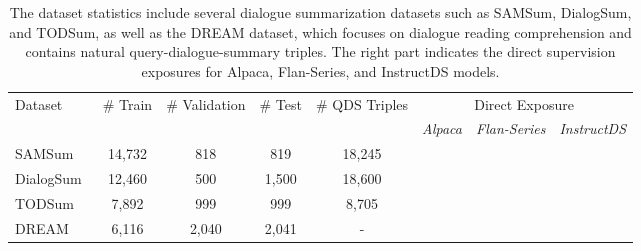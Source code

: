 \documentclass[11pt]{article}
\newcommand{\cmark}{\ding{51}}\newcommand{\xmark}{\ding{55}}\usepackage{subcaption}
\begin{document}
\begin{table*}[t]
        \centering
        \begin{adjustbox}{width=1.00\textwidth,center}
        \begin{tabular}{| l | c | c | c | c | c  c  c |}
        \toprule
        \multirow{2}{*}{Dataset} & \multirow{2}{*}{\# Train} & \multirow{2}{*}{\# Validation} & \multirow{2}{*}{\# Test} & \multirow{2}{*}{\# QDS Triples} & \multicolumn{3}{c|}{Direct Exposure}  \\
        & & & & & \emph{Alpaca} & \emph{Flan-Series} & \emph{InstructDS} \\
        \hline
        SAMSum~\cite{gliwa-etal-2019-samsum} & 14,732 & 818 & 819 & 18,245 & \xmark & \cmark & \cmark  \\
        \hline
        DialogSum~\cite{chen-etal-2021-dialogsum} & 12,460 & 500 & 1,500 & 18,600 & \xmark & \xmark & \cmark \\
        \hline
        TODSum~\cite{zhao2021todsum} & 7,892 & 999 & 999 & 8,705 & \xmark & \xmark & \cmark \\
        \hline \hline
        DREAM~\cite{sun-etal-2019-dream} & 6,116 & 2,040 & 2,041 & - & \xmark & \cmark & \xmark \\ 
        \bottomrule
        \end{tabular}
        \end{adjustbox}
        \caption{The dataset statistics include several dialogue summarization datasets such as SAMSum, DialogSum, and TODSum, as well as the DREAM dataset, which focuses on dialogue reading comprehension and contains natural query-dialogue-summary triples. The right part indicates the direct supervision exposures for Alpaca, Flan-Series, and InstructDS models.
        }
        \label{tab:datasets}
    \end{table*}
\end{document}
